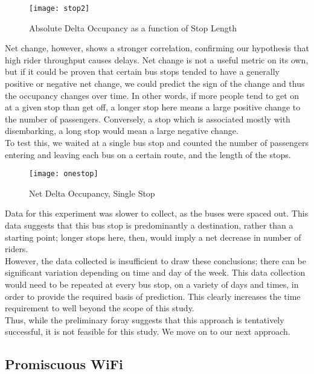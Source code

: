 \documentclass[12pt,journal,compsoc]{IEEEtran}
\begin{document}
	\begin{figure}[!t]
	  \texttt{[image: stop2]}
      \caption{Absolute Delta Occupancy as a function of Stop Length}
	\end{figure}

	Net change, however, shows a stronger correlation, confirming our hypothesis that high rider throughput causes delays. %
    Net change is not a useful metric on its own, but if it could be proven that certain bus stops tended to have a generally positive or negative net change, we could predict the sign of the change and thus the occupancy changes over time.
	In other words, if more people tend to get on at a given stop than get off, a longer stop here means a large positive change to the number of passengers.
	Conversely, a stop which is associated mostly with disembarking, a long stop would mean a large negative change.
\\
	To test this, we waited at a single bus stop and counted the number of passengers entering and leaving each bus on a certain route, and the length of the stops.

	\begin{figure}[!t]
	  \texttt{[image: onestop]}
      \caption{Net Delta Occupancy, Single Stop}
	\end{figure}

	Data for this experiment was slower to collect, as the buses were spaced out.
	This data suggests that this bus stop is predominantly a destination, rather than a starting point; longer stops here, then, would imply a net decrease in number of riders.
	\\
	However, the data collected is insufficient to draw these conclusions; there can be significant variation depending on time and day of the week.
	This data collection would need to be repeated at every bus stop, on a variety of days and times, in order to provide the required basis of prediction.
	This clearly increases the time requirement to well beyond the scope of this study.
	\\
	Thus, while the preliminary foray suggests that this approach is tentatively successful, it is not feasible for this study.
	We move on to our next approach.

\subsection*{Promiscuous WiFi}
    
\end{document}
